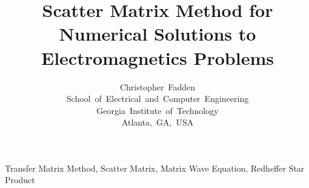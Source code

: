 \documentclass[journal]{IEEEtran}
\begin{document}
\title{Scatter Matrix Method for Numerical Solutions to Electromagnetics Problems}

\author{Christopher~Fadden \\
        School~of~Electrical~and~Computer~Engineering \\
        Georgia~Institute~of~Technology \\
        Atlanta,~GA,~USA}

\maketitle


\begin{IEEEkeywords}
Transfer Matrix Method, Scatter Matrix, Matrix Wave Equation, Redheffer Star Product
\end{IEEEkeywords}










\end{document}
